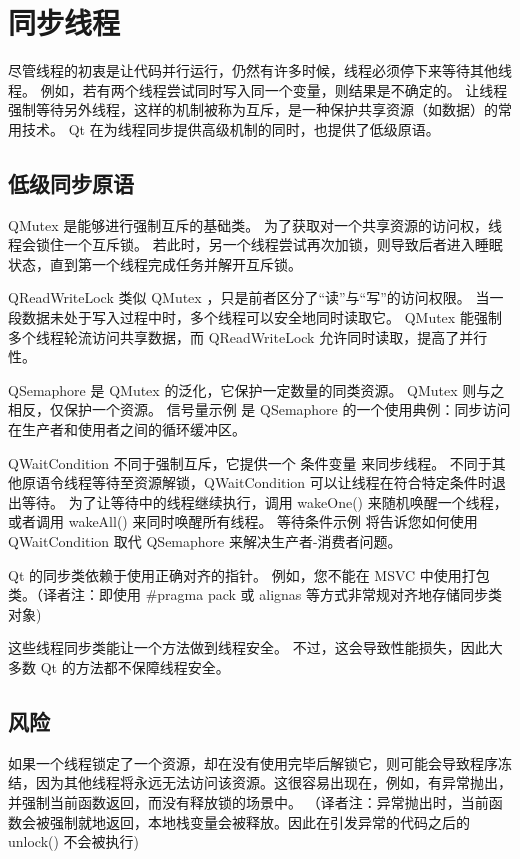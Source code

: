 \chapter{同步线程}

尽管线程的初衷是让代码并行运行，仍然有许多时候，线程必须停下来等待其他线程。
例如，若有两个线程尝试同时写入同一个变量，则结果是不确定的。
让线程强制等待另外线程，这样的机制被称为互斥，是一种保护共享资源（如数据）的常用技术。
Qt 在为线程同步提供高级机制的同时，也提供了低级原语。

\section{低级同步原语}

QMutex 是能够进行强制互斥的基础类。
为了获取对一个共享资源的访问权，线程会锁住一个互斥锁。
若此时，另一个线程尝试再次加锁，则导致后者进入睡眠状态，直到第一个线程完成任务并解开互斥锁。

QReadWriteLock 类似 QMutex ，只是前者区分了“读”与“写”的访问权限。
当一段数据未处于写入过程中时，多个线程可以安全地同时读取它。 
QMutex 能强制多个线程轮流访问共享数据，而 QReadWriteLock 允许同时读取，提高了并行性。

QSemaphore 是 QMutex 的泛化，它保护一定数量的同类资源。
QMutex 则与之相反，仅保护一个资源。
信号量示例 是 QSemaphore 的一个使用典例：同步访问在生产者和使用者之间的循环缓冲区。

QWaitCondition 不同于强制互斥，它提供一个 条件变量 来同步线程。
不同于其他原语令线程等待至资源解锁，QWaitCondition 可以让线程在符合特定条件时退出等待。
为了让等待中的线程继续执行，调用 wakeOne() 来随机唤醒一个线程，
或者调用 wakeAll() 来同时唤醒所有线程。
等待条件示例 将告诉您如何使用 QWaitCondition 取代 QSemaphore 来解决生产者-消费者问题。

\begin{notice}
Qt 的同步类依赖于使用正确对齐的指针。
例如，您不能在 MSVC 中使用打包类。（译者注：即使用 \#pragma pack 或 alignas 等方式非常规对齐地存储同步类对象)

这些线程同步类能让一个方法做到线程安全。
不过，这会导致性能损失，因此大多数 Qt 的方法都不保障线程安全。
\end{notice}




\section{风险}

如果一个线程锁定了一个资源，却在没有使用完毕后解锁它，则可能会导致程序冻结，因为其他线程将永远无法访问该资源。这很容易出现在，例如，有异常抛出，并强制当前函数返回，而没有释放锁的场景中。
（译者注：异常抛出时，当前函数会被强制就地返回，本地栈变量会被释放。因此在引发异常的代码之后的 unlock() 不会被执行)


